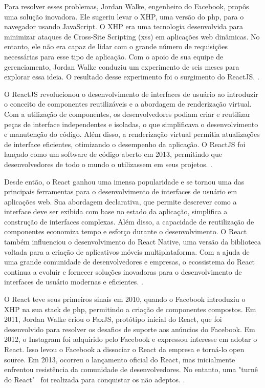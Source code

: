 Para resolver esses problemas, Jordan Walke, engenheiro do Facebook, propôs uma
solução inovadora. Ele sugeriu levar o 
XHP,
uma versão do
\acrshort{php},
para o navegador usando
JavaScript. O 
XHP
era uma tecnologia desenvolvida para minimizar ataques de Cross-Site
Scripting
(\acrshort{xss})
em aplicações
\acrshort{web}
dinâmicas. No entanto, ele não era capaz de lidar com o
grande número de requisições necessárias para esse tipo de aplicação. Com o apoio de sua
equipe de gerenciamento, Jordan Walke conduziu um experimento de seis meses para
explorar essa ideia. O resultado desse experimento foi o surgimento do ReactJS.
\cite{morais-react}.

O ReactJS revolucionou o desenvolvimento de interfaces de usuário ao introduzir o
conceito de componentes reutilizáveis e a abordagem de renderização virtual. Com a
utilização de componentes, os desenvolvedores podiam criar e reutilizar peças de interface
independentes e isoladas, o que simplificava o desenvolvimento e manutenção do código.
Além disso, a renderização virtual permitia atualizações de interface eficientes, otimizando o
desempenho da aplicação. O ReactJS foi lançado como um software de código aberto em
2013, permitindo que desenvolvedores de todo o mundo o utilizassem em seus projetos.
\cite{morais-react}.

Desde então, o React ganhou uma imensa popularidade e se tornou uma das
principais ferramentas para o desenvolvimento de interfaces de usuário em aplicações web.
Sua abordagem declarativa, que permite descrever como a interface deve ser exibida com
base no estado da aplicação, simplifica a construção de interfaces complexas. Além disso, a
capacidade de reutilização de componentes economiza tempo e esforço durante o
desenvolvimento. O React também influenciou o desenvolvimento do React Native, uma
versão da biblioteca voltada para a criação de aplicativos móveis multiplataforma. Com a
ajuda de uma grande comunidade de desenvolvedores e empresas, o ecossistema do React
continua a evoluir e fornecer soluções inovadoras para o desenvolvimento de interfaces de
usuário modernas e eficientes.
\cite{morais-react}.

O React teve seus primeiros sinais em 2010, quando o Facebook introduziu o XHP
na sua stack de
\acrshort{php},
permitindo a criação de componentes compostos. Em 2011, Jordan
Walke criou o FaxJS, protótipo inicial do React, que foi desenvolvido para resolver os
desafios de suporte aos anúncios do Facebook. Em 2012, o Instagram foi adquirido pelo
Facebook e expressou interesse em adotar o React. Isso levou o Facebook a dissociar o React
da empresa e torná-lo open source. Em 2013, ocorreu o lançamento oficial do React, mas
inicialmente enfrentou resistência da comunidade de desenvolvedores. No entanto, uma "turnê
do React"~ foi realizada para conquistar os não adeptos.
\cite{morais-react}.


